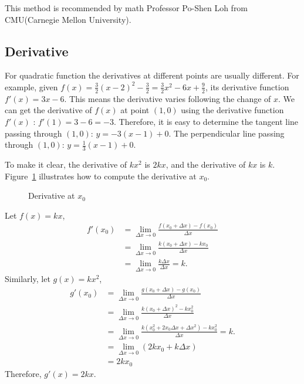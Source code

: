 \documentclass[11pt, oneside]{article}   	%
\begin{document}
This method is recommended by math Professor Po-Shen Loh from CMU(Carnegie Mellon University).
\subsection{Derivative}
For quadratic function the derivatives at different points are usually different. For example, given $f(x)=\frac{3}{2}(x-2)^2-\frac{3}{2}=\frac{3}{2}x^2-6x+\frac{9}{2}$, its derivative function $f'(x)=3x-6$. This means the derivative varies following the change of $x$. We can get the derivative of $f(x)$ at point $(1,0)$ using the derivative function $f'(x)$ : $f'(1)=3-6=-3$. Therefore, it is easy to determine the tangent line passing through $(1,0)$: $y=-3(x-1)+0$. The perpendicular line passing through $(1,0)$: $y=\frac{1}{3}(x-1)+0$. 

To make it clear, the derivative of $kx^2$ is $2kx$, and the derivative of $kx$ is $k$.  Figure~\ref{fig:derivative} illustrates how to compute the derivative at $x_0$.
\begin{figure}
\centering
{}
\caption{Derivative at $x_0$}
\label{fig:derivative}
\end{figure}


Let $f(x)=kx$, 
\begin{align*}
f'(x_0) &=\lim_{\Delta x \rightarrow 0} \frac{f(x_0+\Delta x) - f(x_0)}{\Delta x}\\
&=\lim_{\Delta x \rightarrow 0} \frac{k(x_0+\Delta x) - kx_0}{\Delta x}\\
&=\lim_{\Delta x \rightarrow 0} \frac{k \Delta x}{\Delta x}=k.
\end{align*}
Similarly, let $g(x) = kx^2$,
\begin{align*}
g'(x_0) &=\lim_{\Delta x \rightarrow 0} \frac{g(x_0+\Delta x) - g(x_0)}{\Delta x}\\
&=\lim_{\Delta x \rightarrow 0} \frac{k(x_0+\Delta x)^2 - kx_0^2}{\Delta x}\\
&=\lim_{\Delta x \rightarrow 0} \frac{k(x_0^2+2x_0 \Delta x + \Delta x^2)-kx_0^2}{\Delta x}=k.\\
&=\lim_{\Delta x \rightarrow 0} (2k x_0+k \Delta x)\\
&=2kx_0
\end{align*}
Therefore, $g'(x)=2kx$.
\end{document}

